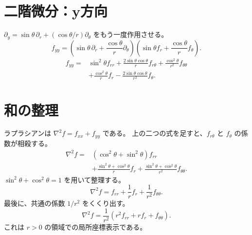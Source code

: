 \documentclass[a4paper,10pt]{ltjsarticle}
\begin{document}
\section*{二階微分：y方向}
$\partial_y=\sin\theta\,\partial_r+(\cos\theta/r)\partial_\theta$ をもう一度作用させる。
\begin{equation}
 f_{yy}=\left(\sin\theta\,\partial_r+\frac{\cos\theta}{r}\partial_\theta\right)
 \left(\sin\theta f_r+\frac{\cos\theta}{r}f_\theta\right). \label{dyy-operator}
\end{equation}
\begin{equation}
 \begin{aligned}
 f_{yy}={}&\sin^2\theta f_{rr}+\frac{2\sin\theta\cos\theta}{r}f_{r\theta}
              +\frac{\cos^2\theta}{r^2}f_{\theta\theta}\\
          &+\frac{\cos^2\theta}{r}f_r-\frac{2\sin\theta\cos\theta}{r^2}f_\theta.
 \end{aligned}\label{dyy-expanded}
\end{equation}
\section*{和の整理}
ラプラシアンは $\nabla^2 f=f_{xx}+f_{yy}$ である。
上の二つの式を足すと、$f_{r\theta}$ と $f_\theta$ の係数が相殺する。
\begin{equation}
 \begin{aligned}
 \nabla^2 f={}&(\cos^2\theta+\sin^2\theta)f_{rr}\\
 &+\frac{\sin^2\theta+\cos^2\theta}{r}f_r
 +\frac{\sin^2\theta+\cos^2\theta}{r^2}f_{\theta\theta}.
 \end{aligned}\label{lap-sum}
\end{equation}
$\sin^2\theta+\cos^2\theta=1$ を用いて整理する。
\begin{equation}
 \nabla^2 f=f_{rr}+\frac{1}{r}f_r+\frac{1}{r^2}f_{\theta\theta}. \label{lap-simplified}
\end{equation}
最後に、共通の係数 $1/r^2$ をくくり出す。
\begin{equation}
 \nabla^2 f=\frac{1}{r^2}\left(r^2 f_{rr}+r f_r+f_{\theta\theta}\right). \label{lap-factored}
\end{equation}
これは $r>0$ の領域での局所座標表示である。
\end{document}
